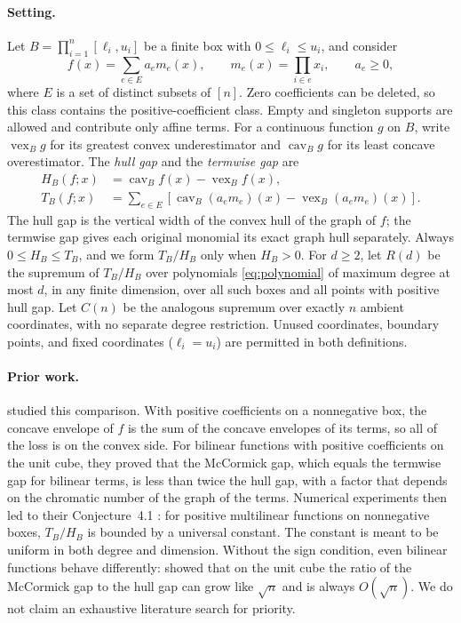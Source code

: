 \documentclass[11pt]{article}
\theoremstyle{remark}
\DeclareMathOperator{\vex}{vex}
\DeclareMathOperator{\cav}{cav}
\begin{document}
\paragraph{Setting.}
Let $B=\prod_{i=1}^n[\ell_i,u_i]$ be a finite box with
$0\le\ell_i\le u_i$, and consider
\begin{equation}\label{eq:polynomial}
 f(x)=\sum_{e\in E}a_e m_e(x),\qquad m_e(x)=\prod_{i\in e}x_i,
 \qquad a_e\ge0,
\end{equation}
where $E$ is a set of distinct subsets of $[n]$. Zero coefficients can be
deleted, so this class contains the positive-coefficient class. Empty and
singleton supports are allowed and contribute only affine terms. For a
continuous function $g$ on $B$, write $\vex_B g$ for its greatest convex
underestimator and $\cav_B g$ for its least concave overestimator. The
\emph{hull gap} and the \emph{termwise gap} are
\begin{align}
 H_B(f;x)&=\cav_B f(x)-\vex_B f(x),\label{eq:hull-gap}\\
 T_B(f;x)&=\sum_{e\in E}
       [\cav_B(a_em_e)(x)-\vex_B(a_em_e)(x)].\label{eq:term-gap}
\end{align}
The hull gap is the vertical width of the convex hull of the graph of $f$;
the termwise gap gives each original monomial its exact graph hull
separately. Always $0\le H_B\le T_B$, and we form $T_B/H_B$ only when
$H_B>0$. For $d\ge2$, let $R(d)$ be the supremum of $T_B/H_B$ over
polynomials \eqref{eq:polynomial} of maximum degree at most $d$, in any
finite dimension, over all such boxes and all points with positive hull
gap. Let $C(n)$ be the analogous supremum over exactly $n$ ambient
coordinates, with no separate degree restriction. Unused coordinates,
boundary points, and fixed coordinates ($\ell_i=u_i$) are permitted in
both definitions.

\paragraph{Prior work.}
\citet{Luedtke2012} studied this comparison. With positive coefficients
on a nonnegative box, the concave envelope of $f$ is the sum of the
concave envelopes of its terms, so all of the loss is on the convex side.
For bilinear functions with positive coefficients on the unit cube, they
proved that the McCormick gap, which equals the termwise gap for bilinear
terms, is less than twice the hull gap, with a factor that depends on the
chromatic number of the graph of the terms. Numerical experiments then led
to their Conjecture~4.1 \citep[p.~349]{Luedtke2012}: for positive
multilinear functions on nonnegative boxes, $T_B/H_B$ is bounded by a
universal constant. The constant is meant to be uniform in both degree
and dimension. Without the sign condition, even bilinear functions behave
differently: \citet{Boland2017} showed that on the unit cube the ratio of
the McCormick gap to the hull gap can grow like $\sqrt n$ and is always
$O(\sqrt n)$. We do not claim an exhaustive literature search for
priority.
\end{document}
